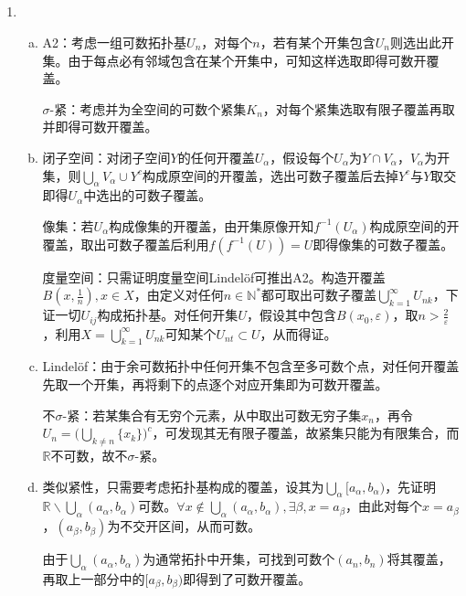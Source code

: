 \documentclass[a4paper,UTF8,fontset=windows]{ctexart}
\begin{document}
\subsection{}
\begin{enumerate}[(1)]
    \item
    \begin{enumerate}[(a)]
    \item
    A2：考虑一组可数拓扑基$U_n$，对每个$n$，若有某个开集包含$U_n$则选出此开集。由于每点必有邻域包含在某个开集中，可知这样选取即得可数开覆盖。
    
    $\sigma$-紧：考虑并为全空间的可数个紧集$K_n$，对每个紧集选取有限子覆盖再取并即得可数开覆盖。
    
    \item
    闭子空间：对闭子空间$Y$的任何开覆盖$U_\alpha$，假设每个$U_\alpha$为$Y\cap V_\alpha$，$V_\alpha$为开集，则$\bigcup_\alpha V_\alpha \cup Y^c$构成原空间的开覆盖，选出可数子覆盖后去掉$Y^c$与$Y$取交即得$U_\alpha$中选出的可数子覆盖。
    
    像集：若$U_\alpha$构成像集的开覆盖，由开集原像开知$f^{-1}(U_\alpha)$构成原空间的开覆盖，取出可数子覆盖后利用$f(f^{-1}(U))=U$即得像集的可数子覆盖。
    
    度量空间：只需证明度量空间Lindel\"of可推出A2。构造开覆盖$B(x,\frac{1}{n}),x\in X$，由定义对任何$n\in\mathbb{N}^*$都可取出可数子覆盖$\bigcup_{k=1}^\infty U_{nk}$，下证一切$U_{ij}$构成拓扑基。对任何开集$U$，假设其中包含$B(x_0,\varepsilon)$，取$n>\frac{2}{\varepsilon}$，利用$X=\bigcup_{k=1}^\infty U_{nk}$可知某个$U_{nt}\subset U$，从而得证。
    
    \item
    Lindel\"of：由于余可数拓扑中任何开集不包含至多可数个点，对任何开覆盖先取一个开集，再将剩下的点逐个对应开集即为可数开覆盖。
    
    不$\sigma$-紧：若某集合有无穷个元素，从中取出可数无穷子集$x_n$，再令$U_n=\big(\bigcup_{k\ne n}\{x_k\}\big)^c$，可发现其无有限子覆盖，故紧集只能为有限集合，而$\mathbb{R}$不可数，故不$\sigma$-紧。
    
    \item
    类似紧性，只需要考虑拓扑基构成的覆盖，设其为$\bigcup_\alpha[a_\alpha,b_\alpha)$，先证明$\mathbb{R}\backslash\bigcup_\alpha(a_\alpha,b_\alpha)$可数。$\forall x\notin\bigcup_\alpha(a_\alpha,b_\alpha),\exists\beta,x=a_\beta$，由此对每个$x=a_\beta$，$(a_\beta,b_\beta)$为不交开区间，从而可数。
    
    由于$\bigcup_\alpha(a_\alpha,b_\alpha)$为通常拓扑中开集，可找到可数个$(a_n,b_n)$将其覆盖，再取上一部分中的$[a_\beta,b_\beta)$即得到了可数开覆盖。
    \end{enumerate}
    

\end{enumerate}
\end{document}
